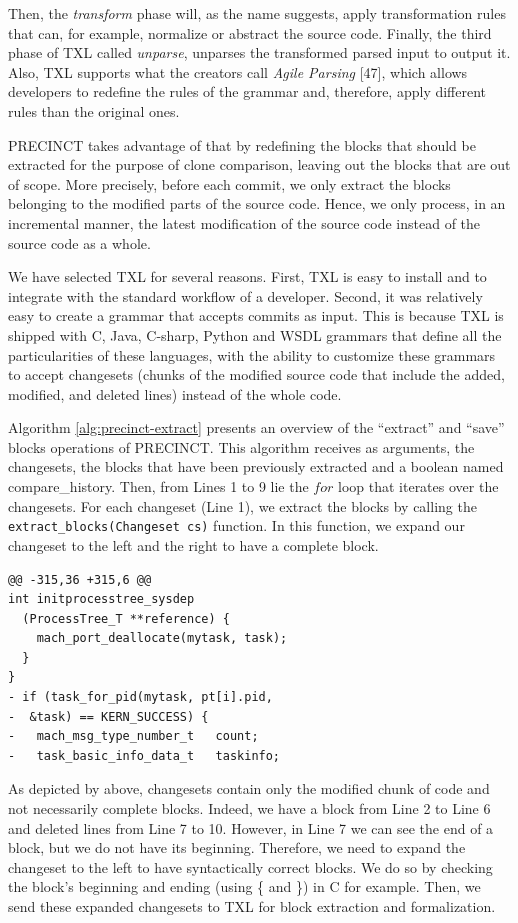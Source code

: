 \documentclass[12pt]{report}
\begin{document}
Then, the \emph{transform} phase will, as the name suggests, apply
transformation rules that can, for example, normalize or abstract the
source code. Finally, the third phase of TXL called \emph{unparse},
unparses the transformed parsed input to output it. Also, TXL supports
what the creators call \emph{Agile Parsing} {[}47{]}, which allows
developers to redefine the rules of the grammar and, therefore, apply
different rules than the original ones.

PRECINCT takes advantage of that by redefining the blocks that should be
extracted for the purpose of clone comparison, leaving out the blocks
that are out of scope. More precisely, before each commit, we only
extract the blocks belonging to the modified parts of the source code.
Hence, we only process, in an incremental manner, the latest
modification of the source code instead of the source code as a whole.

We have selected TXL for several reasons. First, TXL is easy to install
and to integrate with the standard workflow of a developer. Second, it
was relatively easy to create a grammar that accepts commits as input.
This is because TXL is shipped with C, Java, C-sharp, Python and WSDL
grammars that define all the particularities of these languages, with
the ability to customize these grammars to accept changesets (chunks of
the modified source code that include the added, modified, and deleted
lines) instead of the whole code.

Algorithm \ref{alg:precinct-extract} presents an overview of the
``extract'' and ``save'' blocks operations of PRECINCT. This algorithm
receives as arguments, the changesets, the blocks that have been
previously extracted and a boolean named compare\_history. Then, from
Lines 1 to 9 lie the \(for\) loop that iterates over the changesets. For
each changeset (Line 1), we extract the blocks by calling the
\lstinline!extract_blocks(Changeset cs)! function. In this function, we
expand our changeset to the left and the right to have a complete block.

\begin{lstlisting}
@@ -315,36 +315,6 @@
int initprocesstree_sysdep
  (ProcessTree_T **reference) {
    mach_port_deallocate(mytask, task);
  }
}
- if (task_for_pid(mytask, pt[i].pid,
-  &task) == KERN_SUCCESS) {
-   mach_msg_type_number_t   count;
-   task_basic_info_data_t   taskinfo;
\end{lstlisting}

As depicted by above, changesets contain only the modified chunk of code
and not necessarily complete blocks. Indeed, we have a block from Line 2
to Line 6 and deleted lines from Line 7 to 10. However, in Line 7 we can
see the end of a block, but we do not have its beginning. Therefore, we
need to expand the changeset to the left to have syntactically correct
blocks. We do so by checking the block's beginning and ending (using \{
and \}) in C for example. Then, we send these expanded changesets to TXL
for block extraction and formalization.
\end{document}
